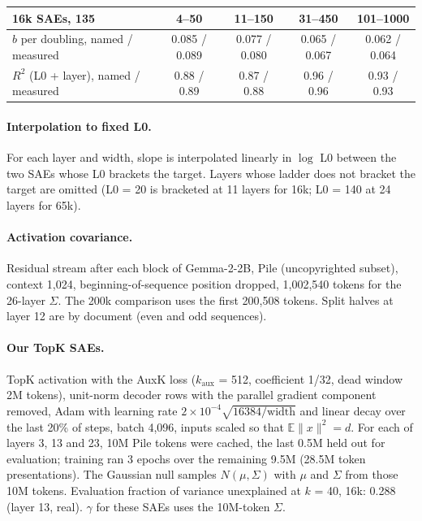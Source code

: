 \documentclass[10pt,twocolumn]{article}
\newcommand{\gam}{\gamma}
\begin{document}
\begin{center}
\small
\begin{tabular}{lcccc}
\toprule
16k SAEs, 135 & 4--50 & 11--150 & 31--450 & 101--1000 \\
\midrule
$b$ per doubling, named / measured & 0.085 / 0.089 & 0.077 / 0.080 & 0.065 / 0.067 & 0.062 / 0.064 \\
$R^2$ (L0 + layer), named / measured & 0.88 / 0.89 & 0.87 / 0.88 & 0.96 / 0.96 & 0.93 / 0.93 \\
\bottomrule
\end{tabular}
\end{center}

\paragraph{Interpolation to fixed L0.} For each layer and width, slope is interpolated linearly in $\log$ L0 between the two SAEs whose L0 brackets the target. Layers whose ladder does not bracket the target are omitted (L0 = 20 is bracketed at 11 layers for 16k; L0 = 140 at 24 layers for 65k).

\paragraph{Activation covariance.} Residual stream after each block of Gemma-2-2B, Pile (uncopyrighted subset), context 1,024, beginning-of-sequence position dropped, 1,002,540 tokens for the 26-layer $\Sigma$. The 200k comparison uses the first 200,508 tokens. Split halves at layer 12 are by document (even and odd sequences).

\paragraph{Our TopK SAEs.} TopK activation with the AuxK loss ($k_{\text{aux}}$ = 512, coefficient 1/32, dead window 2M tokens), unit-norm decoder rows with the parallel gradient component removed, Adam with learning rate $2\times10^{-4}\sqrt{16384/\text{width}}$ and linear decay over the last 20\% of steps, batch 4,096, inputs scaled so that $\mathbb{E}\|x\|^2 = d$. For each of layers 3, 13 and 23, 10M Pile tokens were cached, the last 0.5M held out for evaluation; training ran 3 epochs over the remaining 9.5M (28.5M token presentations). The Gaussian null samples $N(\mu,\Sigma)$ with $\mu$ and $\Sigma$ from those 10M tokens. Evaluation fraction of variance unexplained at $k$ = 40, 16k: 0.288 (layer 13, real). $\gam$ for these SAEs uses the 10M-token $\Sigma$.
\end{document}
